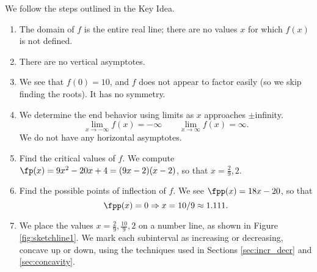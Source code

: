 {We follow the steps outlined in the Key Idea.
\begin{enumerate}
\item		The domain of $f$ is the entire real line; there are no values $x$ for which $f(x)$ is not defined.
\item		There are no vertical asymptotes.
\item		We see that $f(0)=10$, and $f$ does not appear to factor easily (so we skip finding the roots).  It has no symmetry.
\item		We determine the end behavior using limits as $x$ approaches $\pm$infinity.				
			$$\lim_{x\to-\infty}f(x)=-\infty\qquad\lim_{x\to\infty}f(x)=\infty.$$
			We do not have any horizontal asymptotes.
\item		Find the critical values of $f$. We compute $\fp(x) = 9x^2-20x+4=(9x-2)(x-2)$, so that $x=\frac29,2$.
\item		Find the possible points of inflection of $f$. We see $\fpp(x) = 18x-20$, so that $$\fpp(x) = 0 \Rightarrow x= 10/9 \approx 1.111.$$
\item		We place the values $x=\frac29,\frac{10}9,2$ on a number line, as shown in Figure \ref{fig:sketchline1}. We mark each subinterval as increasing or decreasing, concave up or down, using the techniques used in Sections \ref{sec:incr_decr} and \ref{sec:concavity}.


\end{enumerate}}
